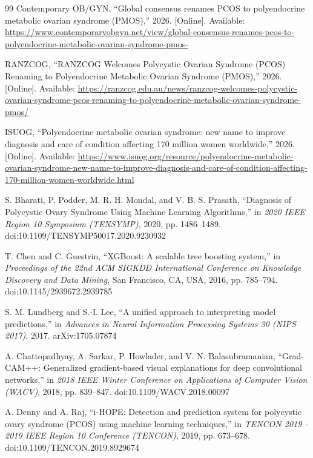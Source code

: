 \documentclass[conference]{IEEEtran}
\begin{document}
\begin{thebibliography}{99}
Contemporary OB/GYN, ``Global consensus renames PCOS to polyendocrine metabolic ovarian syndrome (PMOS),'' 2026. [Online]. Available: \url{https://www.contemporaryobgyn.net/view/global-consensus-renames-pcos-to-polyendocrine-metabolic-ovarian-syndrome-pmos-}

RANZCOG, ``RANZCOG Welcomes Polycystic Ovarian Syndrome (PCOS) Renaming to Polyendocrine Metabolic Ovarian Syndrome (PMOS),'' 2026. [Online]. Available: \url{https://ranzcog.edu.au/news/ranzcog-welcomes-polycystic-ovarian-syndrome-pcos-renaming-to-polyendocrine-metabolic-ovarian-syndrome-pmos/}

ISUOG, ``Polyendocrine metabolic ovarian syndrome: new name to improve diagnosis and care of condition affecting 170 million women worldwide,'' 2026. [Online]. Available: \url{https://www.isuog.org/resource/polyendocrine-metabolic-ovarian-syndrome-new-name-to-improve-diagnosis-and-care-of-condition-affecting-170-million-women-worldwide.html}

S. Bharati, P. Podder, M. R. H. Mondal, and V. B. S. Prasath, ``Diagnosis of Polycystic Ovary Syndrome Using Machine Learning Algorithms,'' in \textit{2020 IEEE Region 10 Symposium (TENSYMP)}, 2020, pp. 1486--1489. doi:10.1109/TENSYMP50017.2020.9230932

T. Chen and C. Guestrin, ``XGBoost: A scalable tree boosting system,'' in \textit{Proceedings of the 22nd ACM SIGKDD International Conference on Knowledge Discovery and Data Mining}, San Francisco, CA, USA, 2016, pp. 785--794. doi:10.1145/2939672.2939785

S. M. Lundberg and S.-I. Lee, ``A unified approach to interpreting model predictions,'' in \textit{Advances in Neural Information Processing Systems 30 (NIPS 2017)}, 2017. arXiv:1705.07874

A. Chattopadhyay, A. Sarkar, P. Howlader, and V. N. Balasubramanian, ``Grad-CAM++: Generalized gradient-based visual explanations for deep convolutional networks,'' in \textit{2018 IEEE Winter Conference on Applications of Computer Vision (WACV)}, 2018, pp. 839--847. doi:10.1109/WACV.2018.00097

A. Denny and A. Raj, ``i-HOPE: Detection and prediction system for polycystic ovary syndrome (PCOS) using machine learning techniques,'' in \textit{TENCON 2019 - 2019 IEEE Region 10 Conference (TENCON)}, 2019, pp. 673--678. doi:10.1109/TENCON.2019.8929674


\end{thebibliography}
\end{document}
